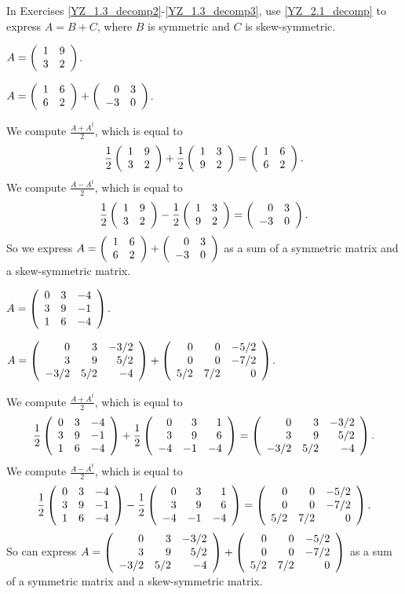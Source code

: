\documentclass{ximera}
\begin{document}
In Exercises \ref{YZ_1.3_decomp2}-\ref{YZ_1.3_decomp3}, use \eqref{YZ_2.1_decomp} to express $A=B+C$, where $B$ is symmetric and $C$ is skew-symmetric.

\begin{exercise}\label{YZ_1.3_decomp2}
$A=\Matrix{1&9\\3&2}$.

\begin{solution}
\ans $A=\Matrix{1&6\\6&2}+\Matrix{0&3\\-3&0}$.

\soln We compute $\frac{A+A^t}{2}$, which is equal to 
\[
\frac12\Matrix{1&9\\3&2}+\frac12\Matrix{1&3\\9&2}=\Matrix{1&6\\6&2}.
\]
We compute $\frac{A-A^t}{2}$, which is equal to 
\[
\frac12\Matrix{1&9\\3&2}-\frac12\Matrix{1&3\\9&2}=\Matrix{0&3\\-3&0}.
\]
So we express $A=\Matrix{1&6\\6&2}+\Matrix{0&3\\-3&0}$ as a sum of a symmetric matrix and a skew-symmetric matrix.
\end{solution}
\end{exercise}


\begin{exercise}\label{YZ_1.3_decomp3}
$A=\Matrix{0&3&-4\\3&9&-1\\1&6&-4}$. 

\begin{solution}
\ans $A=\Matrix{0&3&-3/2\\3&9&5/2\\-3/2&5/2&-4}+\Matrix{0&0&-5/2\\0&0&-7/2\\5/2&7/2&0}$.

\soln
We compute $\frac{A+A^t}{2}$, which is equal to 
\[
\frac{1}{2}\Matrix{0&3&-4\\3&9&-1\\1&6&-4}+\frac{1}{2}\Matrix{0&3&1\\3&9&6\\-4&-1&-4}=\Matrix{0&3&-3/2\\3&9&5/2\\-3/2&5/2&-4}.
\]
We compute $\frac{A-A^t}{2}$, which is equal to 
\[
\frac{1}{2}\Matrix{0&3&-4\\3&9&-1\\1&6&-4}-\frac{1}{2}\Matrix{0&3&1\\3&9&6\\-4&-1&-4}=\Matrix{0&0&-5/2\\0&0&-7/2\\5/2&7/2&0}.
\]
So can express $A=\Matrix{0&3&-3/2\\3&9&5/2\\-3/2&5/2&-4}+\Matrix{0&0&-5/2\\0&0&-7/2\\5/2&7/2&0}$
as a sum of a symmetric matrix and a skew-symmetric matrix.

\end{solution}
\end{exercise}
\end{document}
